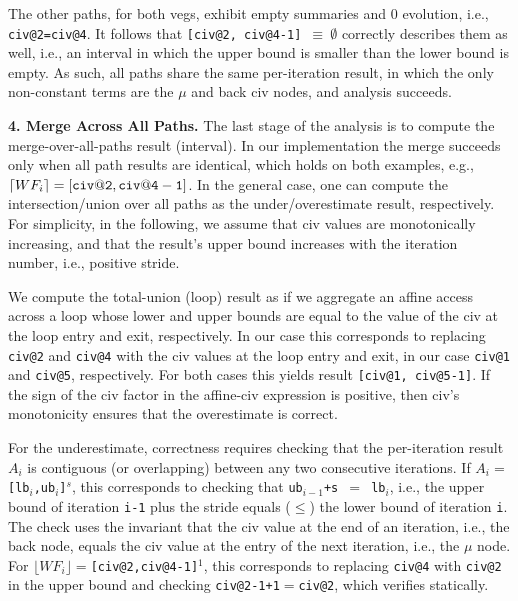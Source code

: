 \documentclass{sig-alternate}
\begin{document}
The other paths, for both {\sc veg}s, exhibit empty summaries and $0$ evolution,
i.e., {\tt civ@2=civ@4}. 
It follows that {\tt [civ@2, civ@4-1]~$\equiv \ \emptyset$} correctly 
describes them as well, i.e., an interval in which the upper bound is smaller 
than the lower bound is empty.
  As such, all paths share the same per-iteration result, in which the only 
non-constant terms are the $\mu$ and back {\sc civ} nodes, 
and analysis succeeds.


\vspace{1ex}

{\bf 4. Merge Across All Paths.} 
%
The last stage of the analysis is to compute the merge-over-all-paths result (interval).
In our implementation the merge succeeds only when all path results are 
identical, which holds on both examples, e.g., $\lceil WF_i \rceil = {\tt [civ@2,civ@4-1]}$.
In the general case, one can compute the intersection/union over all paths as the  
under/overestimate result, respectively.
For simplicity, in the following, we assume that {\sc civ} values are monotonically 
increasing, and that the result's upper bound increases with the iteration number,
i.e., positive stride. 


We compute the total-union (loop) result as if we aggregate an affine access
across a loop whose lower and upper bounds are equal to the value of the 
{\sc civ} at the loop entry and exit, respectively.  
%
In our case this corresponds to replacing {\tt civ@2} and {\tt civ@4} 
with the {\sc civ} values at the loop entry and exit, in our case 
{\tt civ@1} and {\tt civ@5}, respectively. 
For both cases this yields result
{\tt [civ@1, civ@5-1]}.   If the sign of the {\sc civ} factor in
the affine-{\sc civ} expression is positive, then {\sc civ}'s
monotonicity ensures that the overestimate is correct. 

For the underestimate, correctness requires checking that the
per-iteration result $A_i$ is contiguous (or overlapping) 
between any two consecutive iterations. If $A_i=${\tt[lb$_i$,ub$_i$]$^s$},
this corresponds to checking that {\tt ub$_{i-1}$+s $=$ lb$_i$},
i.e., the upper bound of iteration {\tt i-1} plus the stride equals ($\leq$) 
the lower bound of iteration {\tt i}.
%
The check uses the invariant that the {\sc civ} value  
at the end of an iteration, i.e., the back node, equals 
the {\sc civ} value at the entry of the next iteration,
i.e., the $\mu$ node.
%
For $\lfloor WF_i \rfloor=${\tt [{\tt civ@2},{\tt civ@4}-1]$^1$},
this corresponds to replacing {\tt civ@4} with {\tt civ@2} in the upper bound 
and checking {\tt civ@2-1+1$=$civ@2}, which verifies statically. 
\end{document}
